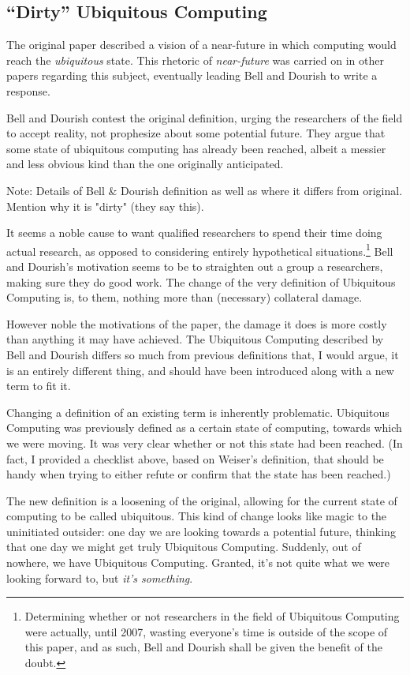 \subsection*{``Dirty'' Ubiquitous Computing}

The original paper described a vision of a near-future in which computing would reach the \emph{ubiquitous} state.
This rhetoric of \emph{near-future} was carried on in other papers regarding this subject, eventually leading Bell
and Dourish to write a response.

Bell and Dourish contest the original definition, urging the researchers of the field to accept reality, not
prophesize about some potential future. They argue that some state of ubiquitous computing has already been
reached, albeit a messier and less obvious kind than the one originally anticipated.

Note: Details of Bell \& Dourish definition as well as where it differs from original. Mention why it is "dirty"
(they say this).\cite{bell07}

It seems a noble cause to want qualified researchers to spend their time doing actual research, as opposed to
considering entirely hypothetical situations.\footnote{Determining whether or not researchers in the field of
Ubiquitous Computing were actually, until 2007, wasting everyone's time is outside of the scope of this paper,
and as such, Bell and Dourish shall be given the benefit of the doubt.} Bell and Dourish's motivation seems to
be to straighten out a group a researchers, making sure they do good work. The change of the very definition of
Ubiquitous Computing is, to them, nothing more than (necessary) collateral damage.

However noble the motivations of the paper, the damage it does is more costly than anything it may have achieved.
The Ubiquitous Computing described by Bell and Dourish differs so much from previous definitions that, I would argue,
it is an entirely different thing, and should have been introduced along with a new term to fit it.

Changing a definition of an existing term is inherently problematic. Ubiquitous Computing was previously defined
as a certain state of computing, towards which we were moving. It was very clear whether or not this state had been
reached. (In fact, I provided a checklist above, based on Weiser's definition, that should be handy when trying to
either refute or confirm that the state has been reached.)

The new definition is a loosening of the original, allowing for the current state of computing to be called ubiquitous.
This kind of change looks like magic to the uninitiated outsider: one day we are looking towards a potential future,
thinking that one day we might get truly Ubiquitous Computing. Suddenly, out of nowhere, we have Ubiquitous Computing.
Granted, it's not quite what we were looking forward to, but \emph{it's something}.

